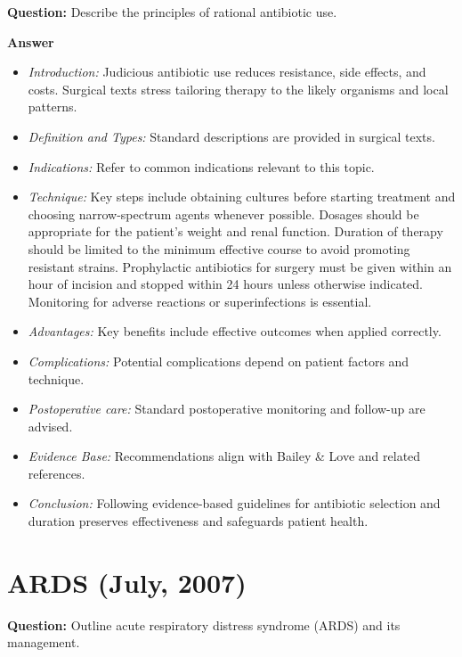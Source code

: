\documentclass{article}
\begin{document}
\textbf{Question:} Describe the principles of rational antibiotic use.

\textbf{Answer}
\begin{itemize}

\item \emph{Introduction:} Judicious antibiotic use reduces resistance, side effects, and costs. Surgical texts stress tailoring therapy to the likely organisms and local patterns.
\item \emph{Definition and Types:} Standard descriptions are provided in surgical texts.
\item \emph{Indications:} Refer to common indications relevant to this topic.

\item \emph{Technique:} Key steps include obtaining cultures before starting treatment and choosing narrow-spectrum agents whenever possible. Dosages should be appropriate for the patient's weight and renal function. Duration of therapy should be limited to the minimum effective course to avoid promoting resistant strains. Prophylactic antibiotics for surgery must be given within an hour of incision and stopped within 24 hours unless otherwise indicated. Monitoring for adverse reactions or superinfections is essential.
\item \emph{Advantages:} Key benefits include effective outcomes when applied correctly.
\item \emph{Complications:} Potential complications depend on patient factors and technique.
\item \emph{Postoperative care:} Standard postoperative monitoring and follow-up are advised.
\item \emph{Evidence Base:} Recommendations align with Bailey \& Love and related references.

\item \emph{Conclusion:} Following evidence-based guidelines for antibiotic selection and duration preserves effectiveness and safeguards patient health.


\end{itemize}

\section{ARDS (July, 2007)}

\textbf{Question:} Outline acute respiratory distress syndrome (ARDS) and its management.
\end{document}
